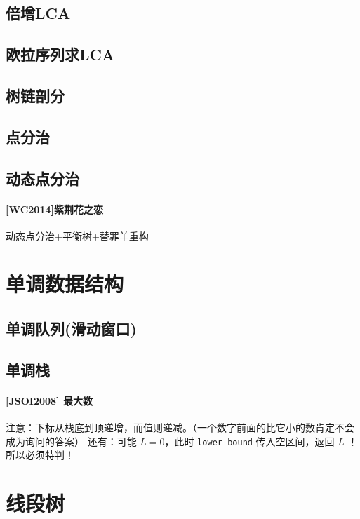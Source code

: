 \documentclass{article}
\begin{document}
		\subsection{倍增LCA}
		
		\subsection{欧拉序列求LCA}
		
		\subsection{树链剖分}
		
		\subsection{点分治}
		
		\subsection{动态点分治}
		\paragraph{[WC2014]紫荆花之恋}
		动态点分治+平衡树+替罪羊重构
		
	\newpage

	\section{单调数据结构}
		\subsection{单调队列(滑动窗口)}
		
		\subsection{单调栈}
		\paragraph{[JSOI2008] 最大数}
		注意：下标从栈底到顶递增，而值则递减。（一个数字前面的比它小的数肯定不会成为询问的答案）
		还有：可能 $L = 0$，此时 \lstinline|lower_bound| 传入空区间，返回 $L$ ！ 所以必须特判！
		

	\newpage

	\section{线段树}
\end{document}
